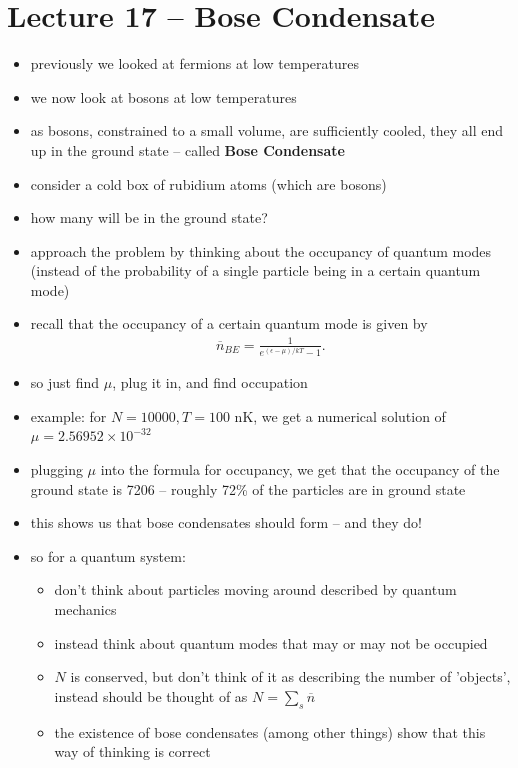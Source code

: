 \documentclass[10pt]{article}
\begin{document}
\section{Lecture 17 -- Bose Condensate}
\begin{itemize}
    \item previously we looked at fermions at low temperatures
    \item we now look at bosons at low temperatures
    \item as bosons, constrained to a small volume, are sufficiently cooled, they all end up in the ground state -- called \textbf{Bose Condensate} 
    \item consider a cold box of rubidium atoms (which are bosons)
    \item how many will be in the ground state?
    \item approach the problem by thinking about the occupancy of quantum modes (instead of the probability of a single particle being in a certain quantum mode)
    \item recall that the occupancy of a certain quantum mode is given by 
        \begin{gather*}
            \overline{n}_{BE}  = \frac{1}{e^{(\epsilon-\mu) / kT}-1}
        .\end{gather*}
    \item so just find $\mu$, plug it in, and find occupation
    \item example: for $N=10000, T = 100$ nK, we get a numerical solution of $\mu = 2.56952 \times 10^{-32}$
    \item plugging $\mu$ into the formula for occupancy, we get that the occupancy of the ground state is 7206 -- roughly 72\% of the particles are in ground state
    \item this shows us that bose condensates should form -- and they do!
    \item so for a quantum system:
        \begin{itemize}
            \item don't think about particles moving around described by quantum mechanics 
            \item instead think about quantum modes that may or may not be occupied 
            \item $N$ is conserved, but don't think of it as describing the number of 'objects', instead should be thought of as $N = \sum_{s} \overline{n}$
            \item the existence of bose condensates (among other things) show that this way of thinking is correct
        \end{itemize}
\end{itemize}
\end{document}
